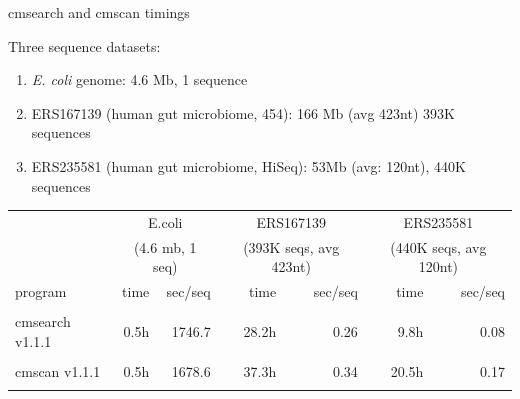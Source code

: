 \documentclass[landscape]{slides}
\begin{document}
\begin{slide}
\begin{center}
cmsearch and cmscan timings
\end{center}
\medskip

\small

Three sequence datasets:
\begin{enumerate}
  \item \emph{E. coli} genome: 4.6 Mb, 1 sequence
  \item ERS167139 (human gut microbiome, 454): 166 Mb (avg 423nt) 393K sequences 
  \item ERS235581 (human gut microbiome, HiSeq): 53Mb (avg: 120nt), 440K sequences
\end{enumerate}

\begin{center}

\medskip
\medskip

\begin{tabular}{l|r|r||r|r||r|r||}
         & \multicolumn{2}{c||}{E.coli}  & \multicolumn{2}{c||}{ERS167139} & \multicolumn{2}{c||}{ERS235581} \\
         & \multicolumn{2}{c||}{(4.6 mb, 1 seq)}  & \multicolumn{2}{c||}{(393K seqs, avg 423nt)} & \multicolumn{2}{c||}{(440K seqs, avg 120nt)} \\ \hline
program  & time & sec/seq & time & sec/seq & time & sec/seq \\ \hline
         &      &  & & & & \\
cmsearch v1.1.1  &     0.5h& 1746.7  & 28.2h   & 0.26    & 9.8h    & 0.08 \\
         &      &  & & & & \\
cmscan v1.1.1   &     0.5h& 1678.6  & 37.3h   & 0.34    & 20.5h   & 0.17 \\
         &      &  & & & & \\ 
\end{tabular}

\end{center}
\vfill
\end{slide}
\end{document}
